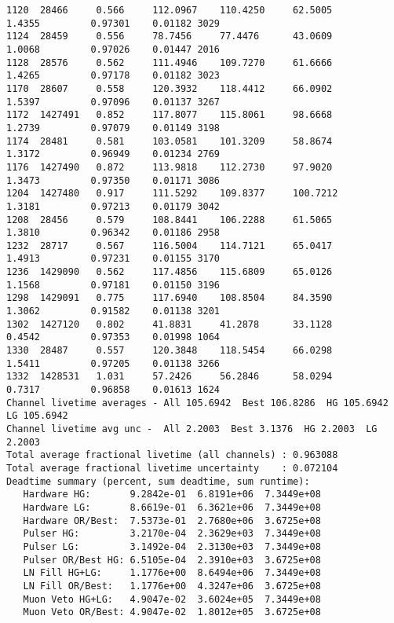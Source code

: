 \documentclass[notitlepage,rmp,aps,10pt]{revtex4-1}
\begin{document}
\begin{verbatim}
1120  28466     0.566     112.0967    110.4250     62.5005        1.4355         0.97301    0.01182 3029
1124  28459     0.556     78.7456     77.4476      43.0609        1.0068         0.97026    0.01447 2016
1128  28576     0.562     111.4946    109.7270     61.6666        1.4265         0.97178    0.01182 3023
1170  28607     0.558     120.3932    118.4412     66.0902        1.5397         0.97096    0.01137 3267
1172  1427491   0.852     117.8077    115.8061     98.6668        1.2739         0.97079    0.01149 3198
1174  28481     0.581     103.0581    101.3209     58.8674        1.3172         0.96949    0.01234 2769
1176  1427490   0.872     113.9818    112.2730     97.9020        1.3473         0.97350    0.01171 3086
1204  1427480   0.917     111.5292    109.8377     100.7212       1.3181         0.97213    0.01179 3042
1208  28456     0.579     108.8441    106.2288     61.5065        1.3810         0.96342    0.01186 2958
1232  28717     0.567     116.5004    114.7121     65.0417        1.4913         0.97231    0.01155 3170
1236  1429090   0.562     117.4856    115.6809     65.0126        1.1568         0.97181    0.01150 3196
1298  1429091   0.775     117.6940    108.8504     84.3590        1.3062         0.91582    0.01138 3201
1302  1427120   0.802     41.8831     41.2878      33.1128        0.4542         0.97353    0.01998 1064
1330  28487     0.557     120.3848    118.5454     66.0298        1.5411         0.97205    0.01138 3266
1332  1428531   1.031     57.2426     56.2846      58.0294        0.7317         0.96858    0.01613 1624
Channel livetime averages - All 105.6942  Best 106.8286  HG 105.6942  LG 105.6942
Channel livetime avg unc -  All 2.2003  Best 3.1376  HG 2.2003  LG 2.2003
Total average fractional livetime (all channels) : 0.963088
Total average fractional livetime uncertainty    : 0.072104
Deadtime summary (percent, sum deadtime, sum runtime):
   Hardware HG:       9.2842e-01  6.8191e+06  7.3449e+08
   Hardware LG:       8.6619e-01  6.3621e+06  7.3449e+08
   Hardware OR/Best:  7.5373e-01  2.7680e+06  3.6725e+08
   Pulser HG:         3.2170e-04  2.3629e+03  7.3449e+08
   Pulser LG:         3.1492e-04  2.3130e+03  7.3449e+08
   Pulser OR/Best HG: 6.5105e-04  2.3910e+03  3.6725e+08
   LN Fill HG+LG:     1.1776e+00  8.6494e+06  7.3449e+08
   LN Fill OR/Best:   1.1776e+00  4.3247e+06  3.6725e+08
   Muon Veto HG+LG:   4.9047e-02  3.6024e+05  7.3449e+08
   Muon Veto OR/Best: 4.9047e-02  1.8012e+05  3.6725e+08


\end{verbatim}
\end{document}
